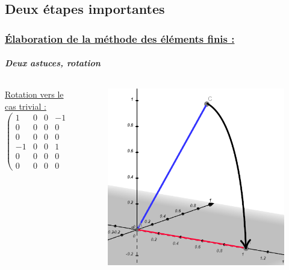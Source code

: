 \documentclass[10pt]{beamer}
\begin{document}
	\subsection{Deux \'etapes importantes}
	\begin{frame}
		\frametitle{\uline{\'Elaboration de la m\'ethode des \'el\'ements finis :}}
		\framesubtitle{\textit{Deux astuces, rotation}}
		\begin{columns}[t]
			\begin{column}{5cm}
				\begin{block}{}
					\uline{Rotation vers le cas trivial :}
  					\begin{equation}
						\begin{pmatrix}
							1 & 0 & 0 & -1 & 0 & 0 \\
							0 & 0 & 0 & 0 & 0 & 0 \\
							0 & 0 & 0 & 0 & 0 & 0 \\
							-1 & 0 & 0 & 1 & 0 & 0 \\
							0 & 0 & 0 & 0 & 0 & 0 \\
							0 & 0 & 0 & 0 & 0 & 0
						\end{pmatrix}
					\end{equation}
				\end{block}
  			\end{column}
 			\begin{column}{5cm}
 				\begin{figure}
 				 	\includegraphics[scale=0.35]{Images/CasFinal.png}
 				\end{figure}
			\end{column}
 		\end{columns}
	\end{frame}
\end{document}
